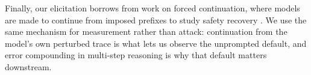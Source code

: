 Finally, our elicitation borrows from work on forced continuation, where models are made to continue from imposed prefixes to study safety recovery \citep{qi2025,vonrecum2026}. We use the same mechanism for measurement rather than attack: continuation from the model's own perturbed trace is what lets us observe the unprompted default, and error compounding in multi-step reasoning \citep{dziri2023} is why that default matters downstream.
